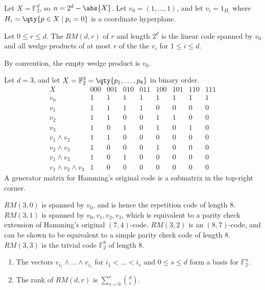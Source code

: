 Let $X = \mathbb F_2^d$, so $n = 2^d - \abs{X}$.
Let $v_0 = (1, \dots, 1)$, and let $v_i = 1_{H_i}$ where $H_i = \qty{p \in X \mid p_i = 0}$ is a coordinate hyperplane.
\begin{definition}
    Let $0 \leq r \leq d$.
    The  $RM(d,r)$ of  $r$ and length $2^d$ is the linear code spanned by $v_0$ and all wedge products of at most $r$ of the the $v_i$ for $1 \leq i \leq d$.
\end{definition}
By convention, the empty wedge product is $v_0$.
\begin{example}
    Let $d = 3$, and let $X = \mathbb F_2^3 = \qty{p_1, \dots, p_8}$ in binary order.
    \[ \begin{array}{c|cccccccc}
        X & 000 & 001 & 010 & 011 & 100 & 101 & 110 & 111 \\\hline
        v_0 & 1 & 1 & 1 & 1 & 1 & 1 & 1 & 1 \\
        v_1 & 1 & 1 & 1 & 1 & 0 & 0 & 0 & 0 \\
        v_2 & 1 & 1 & 0 & 0 & 1 & 1 & 0 & 0 \\
        v_3 & 1 & 0 & 1 & 0 & 1 & 0 & 1 & 0 \\
        v_1 \wedge v_2 & 1 & 1 & 0 & 0 & 0 & 0 & 0 & 0 \\
        v_2 \wedge v_3 & 1 & 0 & 0 & 0 & 1 & 0 & 0 & 0 \\
        v_1 \wedge v_3 & 1 & 0 & 1 & 0 & 0 & 0 & 0 & 0 \\
        v_1 \wedge v_2 \wedge v_3 & 1 & 0 & 0 & 0 & 0 & 0 & 0 & 0
    \end{array} \]
    A generator matrix for Hamming's original code is a submatrix in the top-right corner.
\end{example}
$RM(3,0)$ is spanned by $v_0$, and is hence the repetition code of length 8.
$RM(3,1)$ is spanned by $v_0, v_1, v_2, v_3$, which is equivalent to a parity check extension of Hamming's original $(7,4)$-code.
$RM(3,2)$ is an $(8,7)$-code, and can be shown to be equivalent to a simple parity check code of length 8.
$RM(3,3)$ is the trivial code $\mathbb F_2^8$ of length 8.
\begin{theorem}
    \begin{enumerate}
        \item The vectors $v_{i_1} \wedge \dots \wedge v_{i_s}$ for $i_1 < \dots < i_s$ and $0 \leq s \leq d$ form a basis for $\mathbb F_2^n$.
        \item The rank of $RM(d,r)$ is $\sum_{s=0}^r \binom{d}{s}$.
    \end{enumerate}
\end{theorem}
